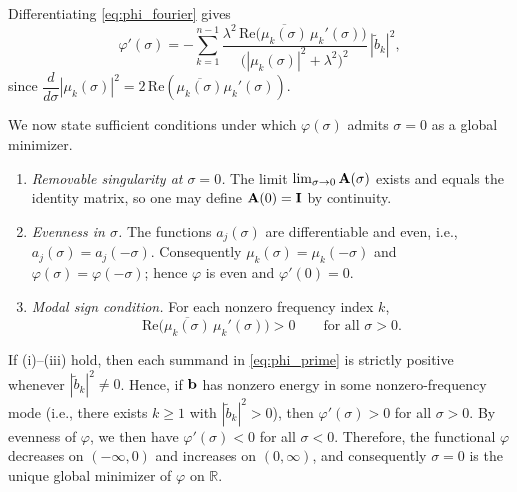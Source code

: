 \documentclass[onefignum,onetabnum]{siamart171218}
\newcommand{\bA}{{\bf A}}
\newcommand{\bI}{{\bf I}}
\newcommand{\bb}{{\bf b}}
\begin{document}
Differentiating \eqref{eq:phi_fourier} gives
\begin{equation}\label{eq:phi_prime}
\varphi'(\sigma)
=
-\sum_{k=1}^{n-1}\frac{\lambda^2\,\mathrm{Re}\!\big(\overline{\mu_k(\sigma)}\,\mu_k'(\sigma)\big)}{\big(|\mu_k(\sigma)|^2+\lambda^2\big)^2}\,|\tilde b_k|^2,
\end{equation}
since \(\dfrac{d}{d\sigma}|\mu_k(\sigma)|^2 = 2\,\mathrm{Re}(\overline{\mu_k(\sigma)}\mu_k'(\sigma))\).

We now state sufficient conditions under which \(\varphi(\sigma)\) admits \(\sigma=0\) as a global minimizer.

\begin{enumerate}[label=(\roman*)]

\item \emph{Removable singularity at \(\sigma=0\).} The limit \(\lim_{\sigma\to0}\bA(\sigma)\) exists and equals the identity matrix, so one may define \(\bA(0)=\bI\) by continuity.
\item \emph{Evenness in \(\sigma\).} The functions $a_j(\sigma)$ are differentiable and even, i.e., $a_j(\sigma) = a_j(-\sigma)$. Consequently \(\mu_k(\sigma)=\mu_k(-\sigma)\) and \(\varphi(\sigma)=\varphi(-\sigma)\); hence \(\varphi\) is even and \(\varphi'(0)=0\).
\item \emph{Modal sign condition.} For each nonzero frequency index \(k\),
\begin{equation*}%
\mathrm{Re}\!\big(\overline{\mu_k(\sigma)}\,\mu_k'(\sigma)\big)>0
\qquad\text{for all }\sigma>0.
\end{equation*}
\end{enumerate}

If (i)–(iii) hold, then each summand in \eqref{eq:phi_prime} is strictly positive whenever \(|\tilde b_k|^2\neq0\). Hence, if 
\(\bb\) has nonzero energy in some nonzero-frequency mode (i.e., there exists \(k\ge1\) with \(|\tilde b_k|^2>0\)), then 
\(\varphi'(\sigma)>0\) for all \(\sigma>0\). By evenness of \(\varphi\), we then have \(\varphi'(\sigma)<0\) for all 
\(\sigma<0\). Therefore, the functional \(\varphi\) decreases on \((-\infty,0)\) and increases on \((0,\infty)\), and consequently \(\sigma=0\) is the unique global minimizer of \(\varphi\) on \(\mathbb{R}\).
\end{document}
